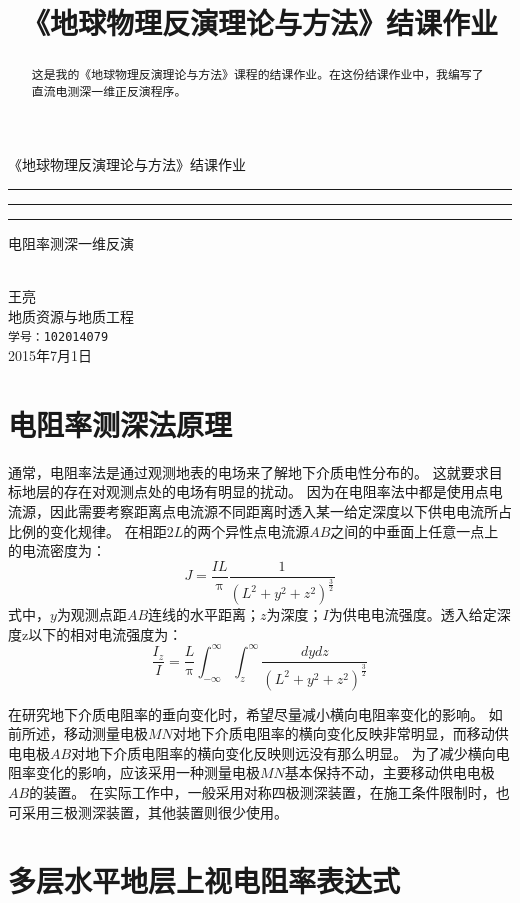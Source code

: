 \documentclass[hyperref,UTF-8,twoside]{ctexart}
\title{\heiti《地球物理反演理论与方法》结课作业}
\newcommand{\cndash}{\rule{0.2em}{0pt}\rule[0.35em]{1.6em}{0.05em}\rule{0.2em}{0pt}}
\numberwithin{equation}{section}
\begin{document}
\begin{titlepage}
\vspace*{40mm}
\begin{center}
{\heiti\Huge《地球物理反演理论与方法》结课作业}\\[5mm]
{\heiti\huge \cndash{}电阻率测深一维反演}\\[30mm]
{\Large 王亮}\\[5mm]
地质资源与地质工程\\\texttt{学号：102014079}\\[80mm]
2015年7月1日
\end{center}
\end{titlepage} 
\thispagestyle{empty}
\mbox{} 
\newpage
\thispagestyle{empty}
\tableofcontents
\newpage
\thispagestyle{empty}
\mbox{} 
\newpage
\begin{abstract}
这是我的《地球物理反演理论与方法》课程的结课作业。在这份结课作业中，我编写了直流电测深一维正反演程序。
\end{abstract}
\section{电阻率测深法原理}
通常，电阻率法是通过观测地表的电场来了解地下介质电性分布的。
这就要求目标地层的存在对观测点处的电场有明显的扰动。
因为在电阻率法中都是使用点电流源，因此需要考察距离点电流源不同距离时透入某一给定深度以下供电电流所占比例的变化规律。
在相距$2L$的两个异性点电流源$AB$之间的中垂面上任意一点上的电流密度为：
\begin{equation}
J = \frac {IL } {\uppi} \frac{1}{(L^2+y^2+z^2)^{\frac{3}{2}}}
\end{equation}
式中，$y$为观测点距$AB$连线的水平距离；$z$为深度；$I$为供电电流强度。透入给定深度z以下的相对电流强度为：
\begin{equation}
\frac{I_z}{I}=\frac{L}{\uppi}\int_{-\infty}^{\infty}\int_{z}^{\infty} \frac{dydz}{(L^2+y^2+z^2)^{\frac{3}{2}}}
\end{equation}

在研究地下介质电阻率的垂向变化时，希望尽量减小横向电阻率变化的影响。
如前所述，移动测量电极$MN$对地下介质电阻率的横向变化反映非常明显，而移动供电电极$AB$对地下介质电阻率的横向变化反映则远没有那么明显。
为了减少横向电阻率变化的影响，应该采用一种测量电极$MN$基本保持不动，主要移动供电电极$AB$的装置。
在实际工作中，一般采用对称四极测深装置，在施工条件限制时，也可采用三极测深装置，其他装置则很少使用。
\section{多层水平地层上视电阻率表达式}
\end{document}
